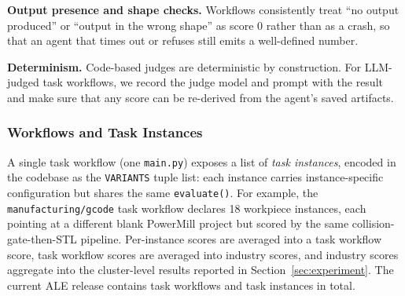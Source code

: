 \noindent \textbf{Output presence and shape checks.}
Workflows consistently treat ``no output produced'' or ``output in the wrong shape'' as score $0$ rather than as a crash, so that an agent that times out or refuses still emits a well-defined number.

\noindent \textbf{Determinism.}
Code-based judges are deterministic by construction. For LLM-judged task workflows, we record the judge model and prompt with the result and make sure that any score can be re-derived from the agent's saved artifacts.

\subsubsection{Workflows and Task Instances}
\label{app:eval-variants}

A single task workflow (one \texttt{main.py}) exposes a list of \emph{task instances}, encoded in the codebase as the \texttt{VARIANTS} tuple list: each instance carries instance-specific configuration but shares the same \texttt{evaluate()}. For example, the \texttt{manufacturing/gcode} task workflow declares 18 workpiece instances, each pointing at a different blank PowerMill project but scored by the same collision-gate-then-STL pipeline. Per-instance scores are averaged into a task workflow score, task workflow scores are averaged into industry scores, and industry scores aggregate into the cluster-level results reported in Section~\ref{sec:experiment}. The current ALE release contains \totaltasks{} task workflows and \totalvariants{} task instances in total.
